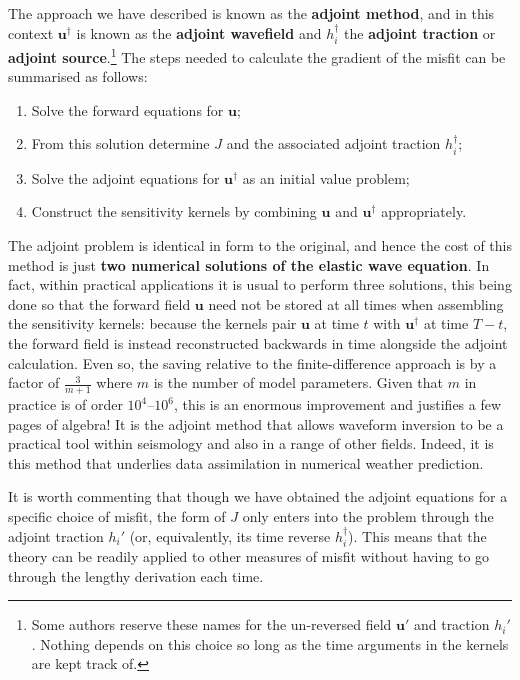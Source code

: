 The approach we have described is known as the \textbf{adjoint method}, and in this context 
$\mathbf{u}^{\dagger}$ is known as the \textbf{adjoint wavefield} and $h_{i}^{\dagger}$ the \textbf{adjoint traction} 
or \textbf{adjoint source}.\footnote{Some authors reserve these names for the un-reversed field $\mathbf{u}'$ and 
traction $h_{i}'$. Nothing depends on this choice so long as the time arguments in the kernels are kept track of.} 
The steps needed to calculate the gradient of the misfit can be summarised as follows:
\begin{enumerate}
    \item Solve the forward equations for $\mathbf{u}$;
    \item From this solution determine $J$ and the associated adjoint traction $h_{i}^{\dagger}$;
    \item Solve the adjoint equations for $\mathbf{u}^{\dagger}$ as an initial value problem;
    \item Construct the sensitivity kernels by combining $\mathbf{u}$ and $\mathbf{u}^{\dagger}$ appropriately.
\end{enumerate}
The adjoint problem is identical in form to the original, and hence the cost of this method is just 
\textbf{two numerical solutions of the elastic wave equation}. In fact, within practical applications it 
is usual to perform three solutions, this being done so that the forward field $\mathbf{u}$ need not be stored at 
all times when assembling the sensitivity kernels: because the kernels pair $\mathbf{u}$ at time $t$ with 
$\mathbf{u}^{\dagger}$ at time $T-t$, the forward field is instead reconstructed backwards in time alongside the 
adjoint calculation. Even so, the saving relative to the finite-difference 
approach is by a factor of $\frac{3}{m+1}$ where $m$ is the number of model parameters. Given that $m$ in practice 
is of order $10^{4}$--$10^{6}$, this is an enormous improvement and justifies a few pages of algebra! 
It is the adjoint method that allows waveform inversion to be a practical tool within seismology and also 
in a range of other fields. Indeed, it is this method that underlies data assimilation in numerical weather prediction.

It is worth commenting that though we have obtained the adjoint equations for a specific choice of misfit, the form of $J$
 only enters into the problem through the adjoint traction $h_{i}'$ (or, equivalently, its time reverse $h_{i}^{\dagger}$). This means that the theory can be readily applied to 
 other measures of misfit without having to go through the lengthy derivation each time.


